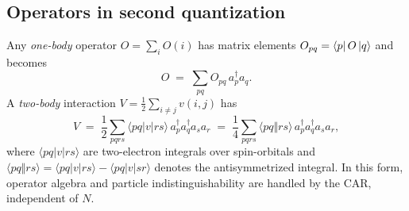 \subsection{Operators in second quantization}
Any \emph{one-body} operator $O=\sum_i O(i)$ has matrix elements
$O_{pq}=\bra{p}O\ket{q}$ and becomes
\[
O \;=\; \sum_{pq} O_{pq}\, a_p^\dagger a_q .
\]
A \emph{two-body} interaction $V=\tfrac12\sum_{i\ne j} v(i,j)$ has
\[
V \;=\; \frac12 \sum_{pqrs} \langle pq | v | rs \rangle \, a_p^\dagger a_q^\dagger a_s a_r
\;=\; \frac14 \sum_{pqrs} \langle pq \Vert rs \rangle \, a_p^\dagger a_q^\dagger a_s a_r ,
\]
where $\langle pq|v|rs\rangle$ are two-electron integrals over spin-orbitals and
$\langle pq\Vert rs\rangle=\langle pq|v|rs\rangle-\langle pq|v|sr\rangle$ denotes the
antisymmetrized integral. In this form, operator algebra and particle indistinguishability
are handled by the CAR, independent of $N$.




